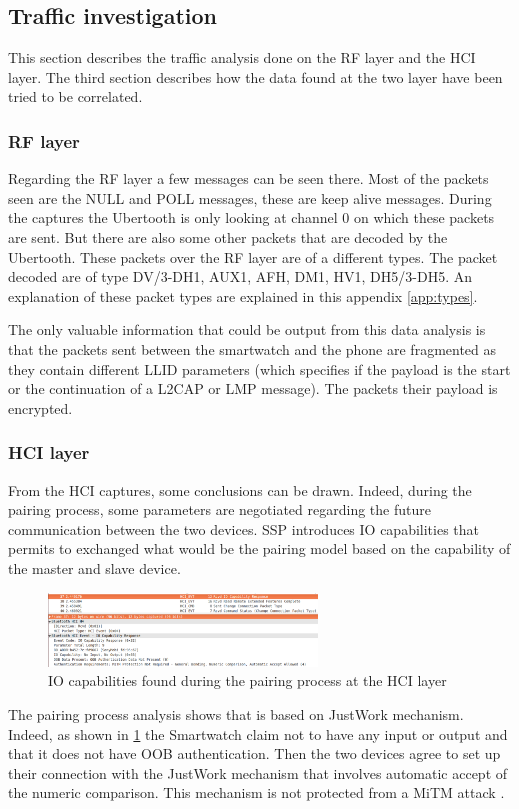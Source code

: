 \subsection{Traffic investigation}
This section describes the traffic analysis done on the RF layer and the HCI layer. The third section describes how the data found at the two layer have been tried to be correlated.
\subsubsection{RF layer}
\label{subsubsection:rflayer}
Regarding the RF layer a few messages can be seen there. Most of the packets seen are the NULL and POLL messages, these are keep alive messages. During the captures the Ubertooth is only looking at channel 0 on which these packets are sent.
But there are also some other packets that are decoded by the Ubertooth. These packets over the RF layer are of a different types. The packet decoded are of type DV/3-DH1, AUX1, AFH, DM1, HV1, DH5/3-DH5. An explanation of these packet types are explained in this appendix \ref{app:types}.

The only valuable information that could be output from this data analysis is that the packets sent between the smartwatch and the phone are fragmented as they contain different LLID parameters (which specifies if the payload is the start or the continuation of a L2CAP or LMP message). The packets their payload is encrypted.

\subsubsection{HCI layer}
From the HCI captures, some conclusions can be drawn. Indeed, during the pairing process, some parameters are negotiated regarding the future communication between the two devices. SSP introduces IO capabilities that permits to exchanged what would be the pairing model based on the capability of the master and slave device. 
\begin{figure}[!h]
	\includegraphics[width=270px]{images/IO_PARAM.png}
	\caption{IO capabilities found during the pairing process at the HCI layer}
	 \label{fig:io1}
\end{figure}
The pairing process analysis shows that is based on JustWork mechanism. Indeed, as shown in \ref{fig:io1} the Smartwatch claim not to have any input or output and that it does not have OOB authentication. Then the two devices agree to set up their connection with the JustWork mechanism that involves automatic accept of the numeric comparison. This mechanism is not protected from a MiTM attack \cite{MiTMjustworks}.

